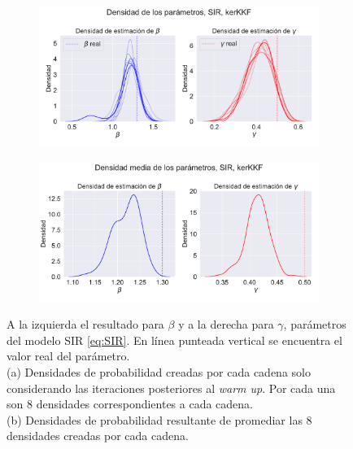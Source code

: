 \begin{figure}[h!]
    \centering
    \begin{subfigure}[b]{0.8\textwidth}
        \includegraphics[width=\linewidth]{img/content/chapter4/nonlinear_filters_sir_params_density.pdf}
        \caption{}
        \label{fig:density_param_estim_SIR}
    \end{subfigure}
    \begin{subfigure}[b]{0.8\textwidth}
        \includegraphics[width=\linewidth]{img/content/chapter4/nonlinear_filters_sir_params_density_mean.pdf}
        \caption{}
        \label{fig:mean_density_param_estim_SIR}
    \end{subfigure}
    \caption{A la izquierda el resultado para $\beta$ y a la derecha para $\gamma$, parámetros del modelo SIR \eqref{eq:SIR}. En línea punteada vertical se encuentra el valor real del parámetro. \\
    (a) Densidades de probabilidad creadas por cada cadena solo considerando las iteraciones posteriores al \textit{warm up}. Por cada una son $8$ densidades correspondientes a cada cadena. \\
    (b) Densidades de probabilidad resultante de promediar las $8$ densidades creadas por cada cadena.}
    
\end{figure}

